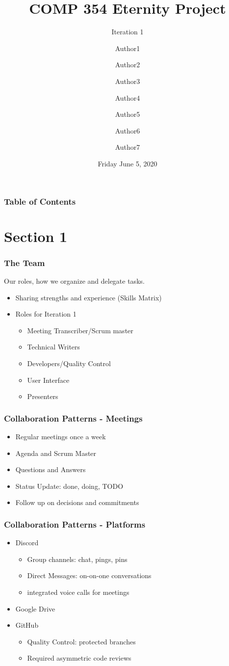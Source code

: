 \documentclass{beamer}
\title{COMP 354 Eternity Project}
\subtitle{Iteration 1}
\author
{Author1\inst{1} 
\and Author2\inst{2} 
\and Author3\inst{3} 
\and Author4\inst{4}
\and Author5\inst{5} 
\and Author6\inst{6}
\and Author7\inst{7}
}
\institute
{
    \inst{1}
    ID ....\\
    \inst{2}
    ID ....\\
    \inst{3}
    ID ....\\
    \inst{4}
    ID ....\\
}
\institute{Concordia University}
\date{Friday June 5, 2020}
\begin{document}
\frame{\titlepage}

\begin{frame}
\frametitle{Table of Contents}
\tableofcontents
\end{frame}

\section{Section 1}
\begin{frame}
\frametitle{The Team}
Our roles, how we organize and delegate tasks.
\begin{itemize}
 \item Sharing strengths and experience (Skills Matrix)
 \item Roles for Iteration 1
  \begin{itemize}
   \item Meeting Transcriber/Scrum master
   \item Technical Writers
   \item Developers/Quality Control
   \item User Interface
   \item Presenters
  \end{itemize}
 \end{itemize}
\end{frame}

\begin{frame}
\frametitle{Collaboration Patterns - Meetings}
\begin{itemize}
 \item Regular meetings once a week
 \item Agenda and Scrum Master
 \item Questions and Answers
 \item Status Update: done, doing, TODO
 \item Follow up on decisions and commitments
\end{itemize}
\end{frame}

\begin{frame}
\frametitle{Collaboration Patterns - Platforms}
\begin{itemize}
 \item Discord
  \begin{itemize}
   \item Group channels: chat, pings, pins
   \item Direct Messages: on-on-one conversations
   \item integrated voice calls for meetings
  \end{itemize}
 \item Google Drive
 \item GitHub
  \begin{itemize}
   \item Quality Control: protected branches
   \item Required asymmetric code reviews
  \end{itemize}
\end{itemize}
\end{frame}
\end{document}
